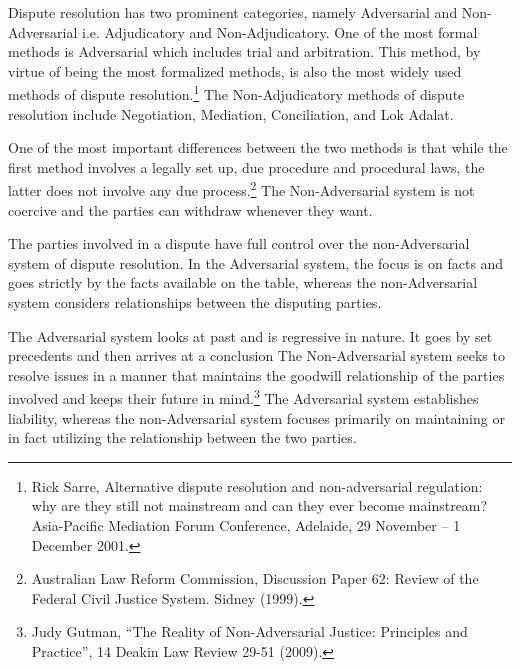 \setcounter{figure}{0}
\setcounter{table}{0}
\setcounter{footnote}{0}

\label{2017-art5}

\begin{multicols}{2}


\noi
Dispute resolution has two prominent categories, namely Adversarial and Non-Adversarial i.e. Adjudicatory and Non-Adjudicatory. One of the most formal methods is Adversarial which includes trial and arbitration. This method, by virtue of being the most formalized methods, is also the most widely used methods of dispute resolution.\footnote{Rick Sarre, Alternative dispute resolution and non-adversarial regulation: why are they still not mainstream and can they ever become mainstream? Asia-Pacific Mediation Forum Conference, Adelaide, 29 November – 1 December 2001.} The Non-Adjudicatory methods of dispute resolution include Negotiation, Mediation, Conciliation, and Lok Adalat.


\noi
One of the most important differences between the two methods is that while the first method
involves a legally set up, due procedure and procedural laws, the latter does not involve any
due process.\footnote{Australian Law Reform Commission, Discussion Paper 62: Review of the Federal Civil Justice System. Sidney (1999).} The Non-Adversarial system is not coercive and the parties can withdraw
whenever they want.

\noi
The parties involved in a dispute have full control over the non-Adversarial system of dispute
resolution. In the Adversarial system, the focus is on facts and goes strictly by the facts
available on the table, whereas the non-Adversarial system considers relationships between the
disputing parties.

\noi
The Adversarial system looks at past and is regressive in nature. It goes by set precedents and
then arrives at a conclusion The Non-Adversarial system seeks to resolve issues in a manner
that maintains the goodwill relationship of the parties involved and keeps their future in
mind.\footnote{Judy Gutman, “The Reality of Non-Adversarial Justice: Principles and Practice”, 14 Deakin Law Review 29-51 (2009).} The Adversarial system establishes liability, whereas the non-Adversarial system focuses primarily on maintaining or in fact utilizing the relationship between the two parties.


\end{multicols}
